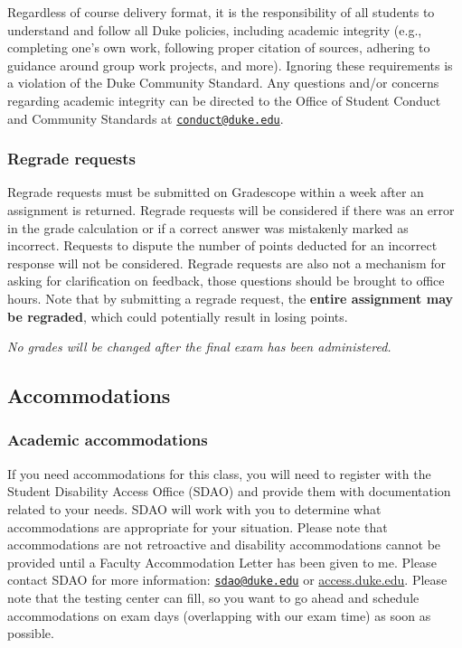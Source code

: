\documentclass[
  letterpaper,
  DIV=11,
  numbers=noendperiod]{scrartcl}
\begin{document}
Regardless of course delivery format, it is the responsibility of all
students to understand and follow all Duke policies, including academic
integrity (e.g., completing one's own work, following proper citation of
sources, adhering to guidance around group work projects, and more).
Ignoring these requirements is a violation of the Duke Community
Standard. Any questions and/or concerns regarding academic integrity can
be directed to the Office of Student Conduct and Community Standards at
\href{mailto:conduct@duke.edu}{\nolinkurl{conduct@duke.edu}}.

\subsubsection{Regrade requests}\label{regrade-requests}

Regrade requests must be submitted on Gradescope within a week after an
assignment is returned. Regrade requests will be considered if there was
an error in the grade calculation or if a correct answer was mistakenly
marked as incorrect. Requests to dispute the number of points deducted
for an incorrect response will not be considered. Regrade requests are
also not a mechanism for asking for clarification on feedback, those
questions should be brought to office hours. Note that by submitting a
regrade request, the \textbf{entire assignment may be regraded}, which
could potentially result in losing points.

\emph{No grades will be changed after the final exam has been
administered.}

\subsection{Accommodations}\label{accommodations}

\subsubsection{Academic accommodations}\label{academic-accommodations}

If you need accommodations for this class, you will need to register
with the Student Disability Access Office (SDAO) and provide them with
documentation related to your needs. SDAO will work with you to
determine what accommodations are appropriate for your situation. Please
note that accommodations are not retroactive and disability
accommodations cannot be provided until a Faculty Accommodation Letter
has been given to me. Please contact SDAO for more information:
\href{mailto:sdao@duke.edu}{\nolinkurl{sdao@duke.edu}} or
\href{https://access.duke.edu/}{access.duke.edu}. Please note that the
testing center can fill, so you want to go ahead and schedule
accommodations on exam days (overlapping with our exam time) as soon as
possible.
\end{document}
